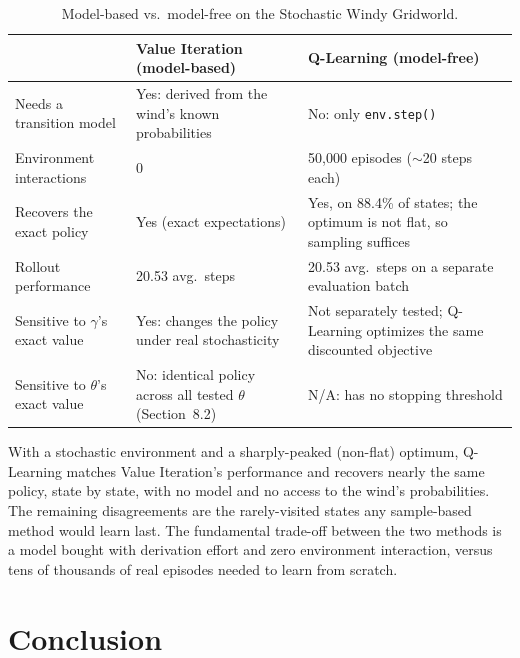 \documentclass[11pt]{article}
\begin{document}
\begin{table}[H]
\centering
\caption{Model-based vs.\ model-free on the Stochastic Windy Gridworld.}
\label{tab:tradeoffs}
\small
\begin{tabularx}{\textwidth}{@{}p{3.8cm}XX@{}}
\toprule
 & Value Iteration (model-based) & Q-Learning (model-free) \\
\midrule
Needs a transition model & Yes: derived from the wind's known probabilities & No: only \texttt{env.step()} \\
Environment interactions & 0 & 50{,}000 episodes ($\sim$20 steps each) \\
Recovers the exact policy & Yes (exact expectations) & Yes, on 88.4\% of states; the optimum is not flat, so sampling suffices \\
Rollout performance & 20.53 avg.\ steps & 20.53 avg.\ steps on a separate evaluation batch \\
Sensitive to $\gamma$'s exact value & Yes: changes the policy under real stochasticity & Not separately tested; Q-Learning optimizes the same discounted objective \\
Sensitive to $\theta$'s exact value & No: identical policy across all tested $\theta$ (Section~8.2) & N/A: has no stopping threshold \\
\bottomrule
\end{tabularx}
\end{table}

With a stochastic environment and a sharply-peaked (non-flat) optimum,
Q-Learning matches Value Iteration's performance and recovers nearly the
same policy, state by state, with no model and no access to the wind's
probabilities. The remaining disagreements are the rarely-visited states
any sample-based method would learn last. The fundamental trade-off between
the two methods is a model bought with derivation effort and zero
environment interaction, versus tens of thousands of real episodes needed
to learn from scratch.

\section{Conclusion}
\end{document}
